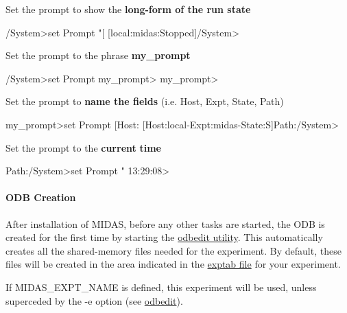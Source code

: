 \begin{DoxyEnumerate}
\item Set the prompt to show the {\bfseries  long-\/form of the run state } 
\begin{DoxyCode}
  /System>set Prompt "[%
  [local:midas:Stopped]/System>
\end{DoxyCode}
 
\item Set the prompt to the phrase {\bfseries my\_\-prompt} 
\begin{DoxyCode}
    /System>set Prompt my_prompt>
    my_prompt>
\end{DoxyCode}



\item Set the prompt to {\bfseries  name the fields } (i.e. Host, Expt, State, Path) 
\begin{DoxyCode}
    my_prompt>set Prompt [Host:%
    [Host:local-Expt:midas-State:S]Path:/System>
\end{DoxyCode}



\item Set the prompt to the {\bfseries current} {\bfseries time} 
\begin{DoxyCode}
    Path:/System>set Prompt "%
    13:29:08>
\end{DoxyCode}






\label{RC_odbedit_examples_idx_ODB_create}
\hypertarget{RC_odbedit_examples_idx_ODB_create}{}
 
\end{DoxyEnumerate}\hypertarget{RC_odbedit_examples_RC_odbedit_create_ODB}{}\paragraph{ODB Creation}\label{RC_odbedit_examples_RC_odbedit_create_ODB}
After installation of MIDAS, before any other tasks are started, the ODB is created for the first time by starting the \hyperlink{RC_odbedit_utility}{odbedit utility}. This automatically creates all the shared-\/memory files needed for the experiment. By default, these files will be created in the area indicated in the \hyperlink{Q_Linux_Q_Linux_Exptab}{exptab file} for your experiment. \par
 If MIDAS\_\-EXPT\_\-NAME is defined, this experiment will be used, unless superceded by the -\/e option (see \hyperlink{RC_odbedit_utility}{odbedit}). \par
 
